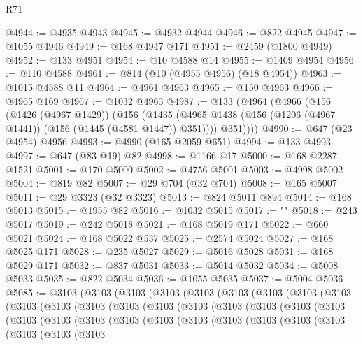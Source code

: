 \begin{lexlean}{R71}
\begin{coremodule}
@4944 := @4935 @4943
@4945 := @4932 @4944
@4946 := @822 @4945
@4947 := @1055 @4946
@4949 := @168 @4947 @171
@4951 := @2459 (@1800 @4949)
@4952 := @133 @4951
@4954 := @10 @4588 @14
@4955 := @1409 @4954
@4956 := @110 @4588
@4961 := @814 (@10 (@4955 @4956) (@18 @4954))
@4963 := @1015 @4588 @11
@4964 := @4961 @4963
@4965 := @150 @4963
@4966 := @4965 @169
@4967 := @1032 @4963
@4987 := @133
    (@4964
      (@4966
        (@156
          (@1426 (@4967 @1429))
          (@156
            (@1435 (@4965 @1438 (@156 (@1206 (@4967 @1441)) (@156 (@1445 (@4581 @1447)) @351))))
            @351))))
@4990 := @647 (@23 @4954) @4956
@4993 := @4990 (@165 @2059 @651)
@4994 := @133 @4993
@4997 := @647 (@83 @19) @82
@4998 := @1166 @17
@5000 := @168 @2287 @1521
@5001 := @170 @5000
@5002 := @4756 @5001
@5003 := @4998 @5002
@5004 := @819 @82
@5007 := @29 @704 (@32 @704)
@5008 := @165 @5007
@5011 := @29 @3323 (@32 @3323)
@5013 := @824 @5011 @894
@5014 := @168 @5013
@5015 := @1955 @82
@5016 := @1032 @5015
@5017 := "\n"
@5018 := @243 @5017
@5019 := @242 @5018
@5021 := @168 @5019 @171
@5022 := @660 @5021
@5024 := @168 @5022 @537
@5025 := @2574 @5024
@5027 := @168 @5025 @171
@5028 := @235 @5027
@5029 := @5016 @5028
@5031 := @168 @5029 @171
@5032 := @837 @5031
@5033 := @5014 @5032
@5034 := @5008 @5033
@5035 := @822 @5034
@5036 := @1055 @5035
@5037 := @5004 @5036
@5085 := @3103
    (@3103
      (@3103
        (@3103
          (@3103
            (@3103
              (@3103
                (@3103
                  (@3103
                    (@3103
                      (@3103
                        (@3103
                          (@3103
                            (@3103
                              (@3103
                                (@3103
                                  (@3103
                                    (@3103
                                      (@3103
                                        (@3103
                                          (@3103
                                            (@3103
                                              (@3103
                                                (@3103
                                                  (@3103
                                                    (@3103
                                                      (@3103
                                                        (@3103
                                                          (@3103
                                                            (@3103
                                                              (@3103
                                                                (@3103

\end{coremodule}
\end{lexlean}
